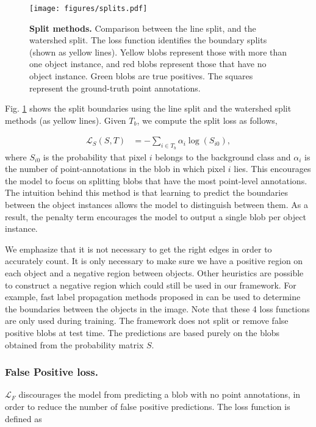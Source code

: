 \documentclass[runningheads]{llncs}
\begin{document}
\begin{figure}[!t]
\centering
\texttt{[image: figures/splits.pdf]}
\caption{{\bf Split methods.} Comparison between the line split, and the watershed split. The loss function identifies the boundary splits (shown as yellow lines). Yellow blobs represent those with more than one object instance, and red blobs represent those that have no object instance. Green blobs are true positives. The squares represent the ground-truth point annotations.}
\label{fig:splits}
\end{figure}

Fig. \ref{fig:splits} shows the split boundaries using the line split and the watershed split methods  (as yellow lines). Given $T_b$, we compute the split loss as follows,

\begin{equation}
\begin{split}
\mathcal{L}_S(S, T) &=  -  \sum_{i \in T_b} \alpha_i \log(S_{i0}),
\end{split}
\label{eq:edgelevel}
\end{equation}
where $S_{i0}$ is the probability that pixel $i$ belongs to the background class and $\alpha_i$ is the number of point-annotations in the blob in which pixel $i$ lies. This encourages the model to focus on splitting blobs that have the most point-level annotations. The intuition behind this method is that learning to predict the boundaries between the object instances allows the model to distinguish between them. As a result, the penalty term encourages the model to output a single blob per object instance. 

We emphasize that it is not necessary to get the right edges in order to accurately count. It is only necessary to make sure we have a positive region on each object and a negative region between objects. Other heuristics are possible to construct a negative region which could still be used in our framework. For example, fast label propagation methods proposed in \cite{nutini2017let,nutini2016convergence} can be used to determine the boundaries between the objects in the image. Note that these 4 loss functions are only used during training. The framework does not split or remove false positive blobs at test time. The predictions are based purely on the blobs obtained from the probability matrix $S$.






\subsubsection{False Positive loss.} $\mathcal{L}_F$ discourages the model from predicting a blob with no point annotations, in order to reduce the number of false positive predictions. The loss function is defined as
\end{document}
